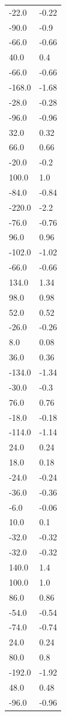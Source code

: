 \begin{longtable}{ll}
-22.0 & -0.22 \\
-90.0 & -0.9 \\
-66.0 & -0.66 \\
40.0 & 0.4 \\
-66.0 & -0.66 \\
-168.0 & -1.68 \\
-28.0 & -0.28 \\
-96.0 & -0.96 \\
32.0 & 0.32 \\
66.0 & 0.66 \\
-20.0 & -0.2 \\
100.0 & 1.0 \\
-84.0 & -0.84 \\
-220.0 & -2.2 \\
-76.0 & -0.76 \\
96.0 & 0.96 \\
-102.0 & -1.02 \\
-66.0 & -0.66 \\
134.0 & 1.34 \\
98.0 & 0.98 \\
52.0 & 0.52 \\
-26.0 & -0.26 \\
8.0 & 0.08 \\
36.0 & 0.36 \\
-134.0 & -1.34 \\
-30.0 & -0.3 \\
76.0 & 0.76 \\
-18.0 & -0.18 \\
-114.0 & -1.14 \\
24.0 & 0.24 \\
18.0 & 0.18 \\
-24.0 & -0.24 \\
-36.0 & -0.36 \\
-6.0 & -0.06 \\
10.0 & 0.1 \\
-32.0 & -0.32 \\
-32.0 & -0.32 \\
140.0 & 1.4 \\
100.0 & 1.0 \\
86.0 & 0.86 \\
-54.0 & -0.54 \\
-74.0 & -0.74 \\
24.0 & 0.24 \\
80.0 & 0.8 \\
-192.0 & -1.92 \\
48.0 & 0.48 \\
-96.0 & -0.96 \\

\end{longtable}
